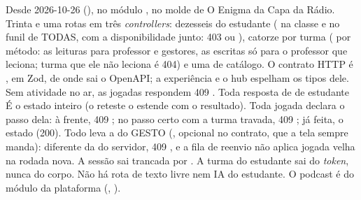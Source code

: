Desde 2026-10-26 (), no módulo , no
molde de O Enigma da Capa da Rádio. Trinta e uma rotas em três
\emph{controllers}: dezesseis do estudante ( na
classe e  no funil de TODAS, com a disponibilidade
junto: 403  ou ), catorze por
turma ( por método: as leituras para professor e gestores, as
escritas só para o professor que leciona; turma que ele não leciona é 404) e
uma de catálogo. O contrato HTTP é , em Zod, de
onde sai o OpenAPI; a experiência e o hub espelham os tipos dele. Sem
atividade no ar, as jogadas respondem 409 . Toda
resposta de  de estudante É o estado inteiro (o reteste o estende
com o resultado). Toda jogada declara o passo dela: à frente, 409
; no passo certo com a turma travada, 409
; já feita, o estado (200). Todo  leva a
 do GESTO (, opcional no contrato, que
a tela sempre manda): diferente da do servidor, 409 , e a
fila de reenvio não aplica jogada velha na rodada nova. A sessão
sai trancada por . A turma do estudante sai do
\emph{token}, nunca do corpo. Não há rota de texto livre nem IA do
estudante. O podcast é do módulo da plataforma
(, ).

